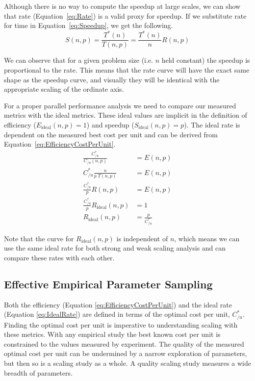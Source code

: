 \documentclass{llncs}
\begin{document}
Although there is no way to compute the speedup at large scales, we can
show that rate (Equation~\ref{eq:Rate}) is a valid proxy for speedup. If we
substitute rate for time in Equation~\ref{eq:Speedup}, we get the
following.
\begin{equation}
  S(n,p) = \frac{T^*(n)}{T(n,p)} = \frac{T^*(n)}{n} R(n,p)
  \label{eq:SpeedupFromRate}
\end{equation}

We can observe that for a given problem size (i.e. $n$ held constant) the
speedup is proportional to the rate. This means that the rate curve will
have the exact same shape as the speedup curve, and visually they will be
identical with the appropriate scaling of the ordinate axis.

For a proper parallel performance analysis we need to compare our measured
metrics with the ideal metrics. These ideal values are implicit in the
definition of efficiency ($E_\mathrm{ideal}(n,p) = 1$) and speedup
($S_\mathrm{ideal}(n,p) = p$). The ideal rate is dependent on the measured
best cost per unit and can be derived from
Equation~\ref{eq:EfficiencyCostPerUnit}.
\begingroup
\addtolength{\jot}{1ex} %
\begin{align}
  \frac{C_{/u}^*}{C_{/u}(n,p)} &= E(n,p) \nonumber \\
  C_{/u}^* \frac{n}{p \; T(n,p)} &= E(n,p) \nonumber \\
  \frac{C_{/u}^*}{p} R(n,p) &= E(n,p) \nonumber \\
  \frac{C_{/u}^*}{p} R_\mathrm{ideal}(n,p) &= 1 \nonumber \\
  R_\mathrm{ideal}(n,p) &= \frac{p}{C_{/u}^*}
  \label{eq:IdealRate}
\end{align}
\endgroup

Note that the curve for $R_\mathrm{ideal}(n,p)$ is independent of $n$,
which means we can use the same ideal rate for both strong and weak scaling
analysis and can compare these rates with each other.

\subsection{Effective Empirical Parameter Sampling}

Both the efficiency (Equation \ref{eq:EfficiencyCostPerUnit}) and the ideal
rate (Equation \ref{eq:IdealRate}) are defined in terms of the optimal cost
per unit, $C_{/u}^*$. Finding the optimal cost per unit is imperative to
understanding scaling with these metrics. With any empirical study the best
known cost per unit is constrained to the values measured by experiment.
The quality of the measured optimal cost per unit can be undermined by a
narrow exploration of parameters, but then so is a scaling study as a
whole. A quality scaling study measures a wide breadth of parameters.
\end{document}
